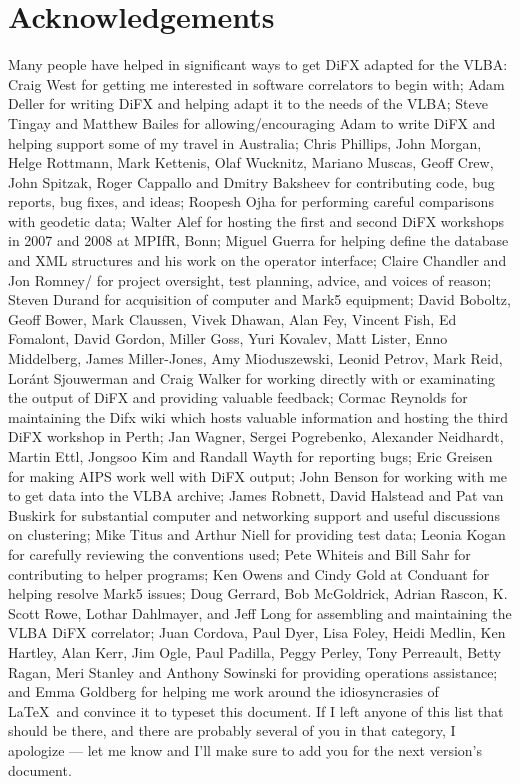 \section{Acknowledgements}

Many people have helped in significant ways to get DiFX adapted for the VLBA:
Craig West for getting me interested in software correlators to begin with; 
Adam Deller for writing DiFX and helping adapt it to the needs of the VLBA; 
Steve Tingay and Matthew Bailes for allowing/encouraging Adam to write DiFX and helping support some of my travel in Australia;
Chris Phillips, John Morgan, Helge Rottmann, Mark Kettenis, Olaf Wucknitz, Mariano Muscas, Geoff Crew, John Spitzak, Roger Cappallo and Dmitry Baksheev for contributing code, bug reports, bug fixes, and ideas;
Roopesh Ojha for performing careful comparisons with geodetic data;
Walter Alef for hosting the first and second DiFX workshops in 2007 and 2008 at MPIfR, Bonn;
Miguel Guerra for helping define the database and XML structures and his work on the operator interface;
Claire Chandler and Jon Romney/ for project oversight, test planning, advice, and voices of reason;
Steven Durand for acquisition of computer and Mark5 equipment;
David Boboltz, Geoff Bower, Mark Claussen, Vivek Dhawan, Alan Fey, Vincent Fish, Ed Fomalont, David Gordon, Miller Goss, Yuri Kovalev, Matt Lister, Enno Middelberg, James Miller-Jones, Amy Mioduszewski, Leonid Petrov, Mark Reid, Lor\'{a}nt Sjouwerman and Craig Walker for working directly with or examinating the output of DiFX and providing valuable feedback;
Cormac Reynolds for maintaining the Difx wiki which hosts valuable information and hosting the third DiFX workshop in Perth;
Jan Wagner, Sergei Pogrebenko, Alexander Neidhardt, Martin Ettl, Jongsoo Kim and Randall Wayth for reporting bugs;
Eric Greisen for making AIPS work well with DiFX output;
John Benson for working with me to get data into the VLBA archive;
James Robnett, David Halstead and Pat van Buskirk for substantial computer and networking support and useful discussions on clustering;
Mike Titus and Arthur Niell for providing test data;
Leonia Kogan for carefully reviewing the conventions used;
Pete Whiteis and Bill Sahr for contributing to helper programs;
Ken Owens and Cindy Gold at Conduant for helping resolve Mark5 issues;
Doug Gerrard, Bob McGoldrick, Adrian Rascon, K. Scott Rowe, Lothar Dahlmayer, and Jeff Long for assembling and maintaining the VLBA DiFX correlator;
Juan Cordova, Paul Dyer, Lisa Foley, Heidi Medlin, Ken Hartley, Alan Kerr, Jim Ogle, Paul Padilla, Peggy Perley, Tony Perreault, Betty Ragan, Meri Stanley and Anthony Sowinski for providing operations assistance;
and
Emma Goldberg for helping me work around the idiosyncrasies of \LaTeX \ and convince it to typeset this document.
If I left anyone of this list that should be there, and there are probably several of you in that category, I apologize --- let me know and I'll make sure to add you for the next version's document.


